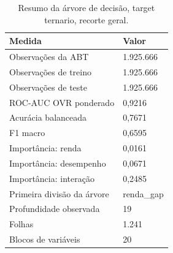 \begin{table}
\caption{Resumo da árvore de decisão, target ternario, recorte geral.}
\label{tab:tabela_treeClassification_ternario_recorte_geral_principal_in_sample_e5}
\begin{tabular}{ll}
\toprule
Medida & Valor \\
\midrule
Observações da ABT & 1.925.666 \\
Observações de treino & 1.925.666 \\
Observações de teste & 1.925.666 \\
ROC-AUC OVR ponderado & 0,9216 \\
Acurácia balanceada & 0,7671 \\
F1 macro & 0,6595 \\
Importância: renda & 0,0161 \\
Importância: desempenho & 0,0671 \\
Importância: interação & 0,2485 \\
Primeira divisão da árvore & renda\_gap \\
Profundidade observada & 19 \\
Folhas & 1.241 \\
Blocos de variáveis & 20 \\
\bottomrule
\end{tabular}
\end{table}
